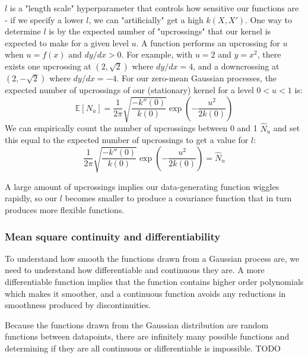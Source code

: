 $l$ is a "length scale" hyperparameter that controls how sensitive our functions are - if we specify a lower $l$, we can "artificially" get a high $k(X,X')$. One way to determine $l$ is by the expected number of "upcrossings" that our kernel is expected to make for a given level $u$. A function performs an upcrossing for $u$ when $u = f(x)$ and $dy/dx > 0$. For example, with $u = 2$ and $y = x^2$, there exists one upcrossing at $(2, \sqrt{2})$ where $dy/dx = 4$, and a downcrossing at $(2, -\sqrt{2})$ where $dy/dx = -4$. For our zero-mean Gaussian processes, the expected number of upcrossings of our (stationary) kernel for a level $ 0 < u < 1$ is:
\begin{equation*}
    \mathbb{E}[N_u] = \frac{1}{2\pi} \sqrt{\frac{-k''(0)}{k(0)}} \exp \left(-\frac{u^2}{2k(0)}\right)
\end{equation*}
We can empirically count the number of upcrossings between 0 and 1 $\hat{N}_u$ and set this equal to the expected number of upcrossings to get a value for $l$:
\begin{equation} \label{eq:general_l}
    \frac{1}{2\pi} \sqrt{\frac{-k''(0)}{k(0)}} \exp \left(-\frac{u^2}{2k(0)}\right) = \hat{N}_u
\end{equation}

A large amount of upcrossings implies our data-generating function wiggles rapidly, so our $l$ becomes smaller to produce a covariance function that in turn produces more flexible functions.

\subsubsection{Mean square continuity and differentiability}
To understand how smooth the functions drawn from a Gaussian process are, we need to understand how differentiable and continuous they are. A more differentiable function implies that the function contains higher order polynomials which makes it smoother, and a continuous function avoids any reductions in smoothness produced by discontinuities.

Because the functions drawn from the Gaussian distribution are random functions between datapoints, there are infinitely many possible functions and determining if they are all continuous or differentiable is impossible. TODO 



